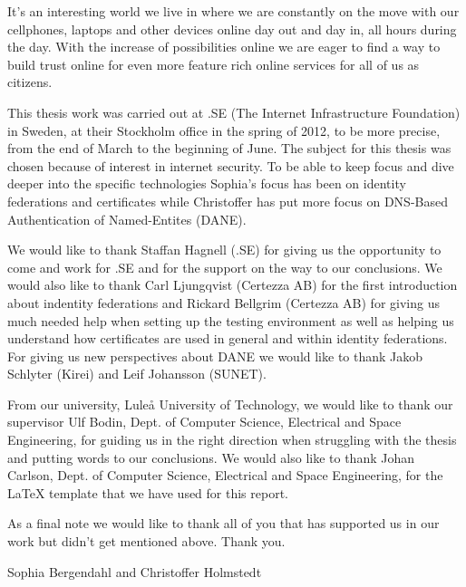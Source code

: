 It's an interesting world we live in where we are constantly on the move with our cellphones, laptops and other devices online day out and day in, all hours during the day.
With the increase of possibilities online we are eager to find a way to build trust online for even more feature rich online services for all of us as citizens.%

This thesis work was carried out at .SE (The Internet Infrastructure Foundation) in Sweden, at their Stockholm office in the spring of 2012, to be more precise, from the end of March to the beginning of June.
The subject for this thesis was chosen because of interest in internet security.
To be able to keep focus and dive deeper into the specific technologies Sophia's focus has been on identity federations and certificates while Christoffer has put more focus on DNS-Based Authentication of Named-Entites (DANE).

We would like to thank Staffan Hagnell (.SE) for giving us the opportunity to come and work for .SE and for the support on the way to our conclusions.
We would also like to thank Carl Ljungqvist (Certezza AB) for the first introduction about indentity federations and Rickard Bellgrim (Certezza AB) for giving us much needed help when setting up the testing environment as well as helping us understand how certificates are used in general and within identity federations.
For giving us new perspectives about DANE we would like to thank Jakob Schlyter (Kirei) and Leif Johansson (SUNET). 

From our university, Lule\r{a} University of Technology, we would like to thank our 
supervisor Ulf Bodin, Dept. of Computer Science, Electrical and Space Engineering, 
for guiding us in the right direction when struggling with the thesis and putting words to our conclusions.
We would also like to thank Johan Carlson, Dept. of Computer Science, Electrical and Space Engineering, 
for the LaTeX template that we have used for this report. 

As a final note we would like to thank all of you that has supported us in our work but didn't get mentioned above.
Thank you.




%



\vspace*{1.5cm}%
\hfill Sophia Bergendahl and Christoffer Holmstedt
